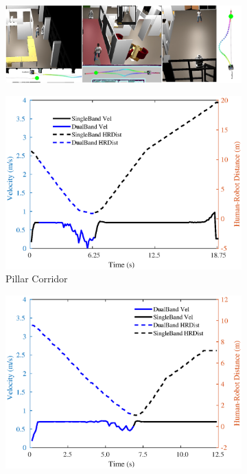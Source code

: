 \begin{figure}[!h]
\centering
    \begin{subfigure}{\textwidth}
    \centering
      \includegraphics[width=0.9\columnwidth]{images/chapter4/co-operative_scenes}
    \end{subfigure}
    \begin{subfigure}{.3\columnwidth}
      \includegraphics[width=\linewidth]{images/chapter4/p_cor.eps}\caption{Pillar Corridor}
    \end{subfigure}
    \hspace{-0.3cm}
    \begin{subfigure}{.3\columnwidth}
      \includegraphics[width=\linewidth]{images/chapter4/n_cor.eps}

\end{subfigure}
\end{figure}
